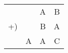 \documentclass{article}
\begin{document}
\begin{tabular}{rrrr}
     &   & A & B \\
  +) &   & B & A \\
  \hline
     & A & A & C
\end{tabular}
\end{document}
